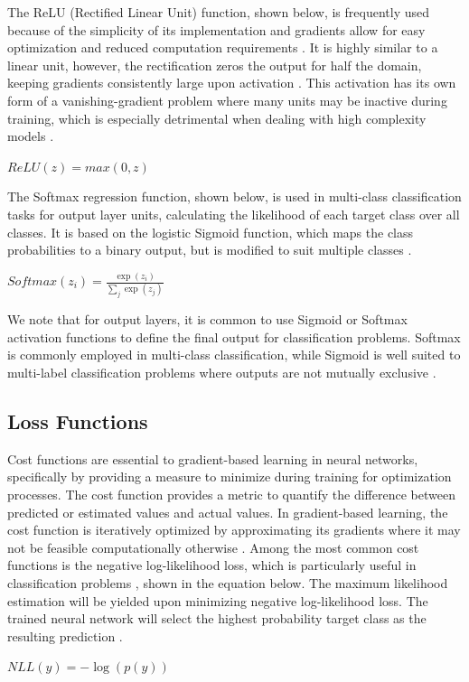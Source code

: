 \documentclass{article}
\begin{document}
The ReLU (Rectified Linear Unit) function, shown below, is frequently used because of the simplicity of its implementation and gradients allow for easy optimization and reduced computation requirements \cite{lederer2021activation,Goodfellow-et-al-2016}. It is highly similar to a linear unit, however, the rectification zeros the output for half the domain, keeping gradients consistently large upon activation \cite{Goodfellow-et-al-2016}. This activation has its own form of a vanishing-gradient problem where many units may be inactive during training, which is especially detrimental when dealing with high complexity models \cite{lederer2021activation}.

\newline
\newline
\centerline{$ReLU(z) = max(0,z)$ \cite{lederer2021activation}}
\newline

The Softmax regression function, shown below, is used in multi-class classification tasks for output layer units, calculating the likelihood of each target class over all classes. It is based on the logistic Sigmoid function, which maps the class probabilities to a binary output, but is modified to suit multiple classes \cite{unsupervised}.

\newline
\newline
\centerline{${Softmax}(z_{i}) = \frac{\exp(z_i)}{\sum_j \exp(z_j)}$ \cite{Goodfellow-et-al-2016}}
\newline

We note that for output layers, it is common to use Sigmoid or Softmax activation functions to define the final output for classification problems. Softmax is commonly employed in multi-class classification, while Sigmoid is well suited to multi-label classification problems where outputs are not mutually exclusive \cite{draelos_2019}.

\subsection{Loss Functions}
Cost functions are essential to gradient-based learning in neural networks, specifically by providing a measure to minimize during training for optimization processes. The cost function provides a metric to quantify the difference between predicted or estimated values and actual values. In gradient-based learning, the cost function is iteratively optimized by approximating its gradients where it may not be feasible computationally otherwise \cite{Goodfellow-et-al-2016}. Among the most common cost functions is the negative log-likelihood loss, which is particularly useful in classification problems \cite{NEURIPS2019_9015,nllloss}, shown in the equation below. The maximum likelihood estimation will be yielded upon minimizing negative log-likelihood loss. The trained neural network will select the highest probability target class as the resulting prediction \cite{Goodfellow-et-al-2016}.
\newline
\newline
\centerline{$NLL(y) = -{\log(p(y))}$ \cite{zhang}}
\newline
\end{document}
